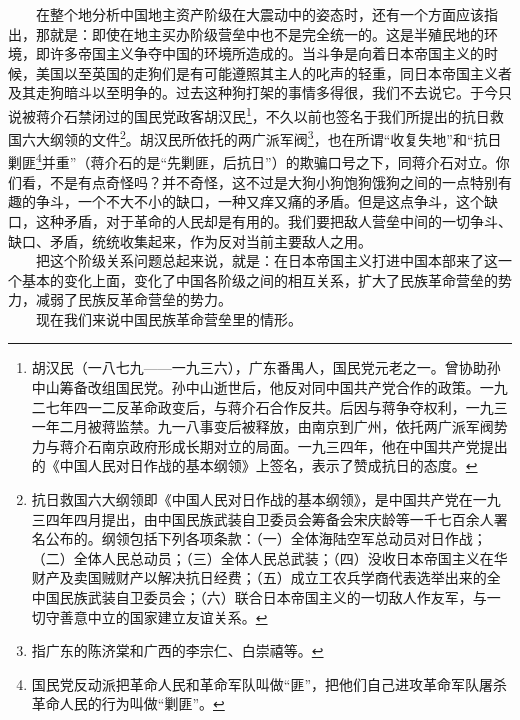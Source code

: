 \documentclass[cn,11pt,chinese]{elegantbook}
\begin{document}
　　在整个地分析中国地主资产阶级在大震动中的姿态时，还有一个方面应该指出，那就是：即使在地主买办阶级营垒中也不是完全统一的。这是半殖民地的环境，即许多帝国主义争夺中国的环境所造成的。当斗争是向着日本帝国主义的时候，美国以至英国的走狗们是有可能遵照其主人的叱声的轻重，同日本帝国主义者及其走狗暗斗以至明争的。过去这种狗打架的事情多得很，我们不去说它。于今只说被蒋介石禁闭过的国民党政客胡汉民\footnote[16]{ 胡汉民（一八七九——一九三六），广东番禺人，国民党元老之一。曾协助孙中山筹备改组国民党。孙中山逝世后，他反对同中国共产党合作的政策。一九二七年四一二反革命政变后，与蒋介石合作反共。后因与蒋争夺权利，一九三一年二月被蒋监禁。九一八事变后被释放，由南京到广州，依托两广派军阀势力与蒋介石南京政府形成长期对立的局面。一九三四年，他在中国共产党提出的《中国人民对日作战的基本纲领》上签名，表示了赞成抗日的态度。}，不久以前也签名于我们所提出的抗日救国六大纲领的文件\footnote[17]{ 抗日救国六大纲领即《中国人民对日作战的基本纲领》，是中国共产党在一九三四年四月提出，由中国民族武装自卫委员会筹备会宋庆龄等一千七百余人署名公布的。纲领包括下列各项条款：（一）全体海陆空军总动员对日作战；（二）全体人民总动员；（三）全体人民总武装；（四）没收日本帝国主义在华财产及卖国贼财产以解决抗日经费；（五）成立工农兵学商代表选举出来的全中国民族武装自卫委员会；（六）联合日本帝国主义的一切敌人作友军，与一切守善意中立的国家建立友谊关系。}。胡汉民所依托的两广派军阀\footnote[18]{ 指广东的陈济棠和广西的李宗仁、白崇禧等。}，也在所谓“收复失地”和“抗日剿匪\footnote[19]{ 国民党反动派把革命人民和革命军队叫做“匪”，把他们自己进攻革命军队屠杀革命人民的行为叫做“剿匪”。}并重”（蒋介石的是“先剿匪，后抗日”）的欺骗口号之下，同蒋介石对立。你们看，不是有点奇怪吗？并不奇怪，这不过是大狗小狗饱狗饿狗之间的一点特别有趣的争斗，一个不大不小的缺口，一种又痒又痛的矛盾。但是这点争斗，这个缺口，这种矛盾，对于革命的人民却是有用的。我们要把敌人营垒中间的一切争斗、缺口、矛盾，统统收集起来，作为反对当前主要敌人之用。\\
　　把这个阶级关系问题总起来说，就是：在日本帝国主义打进中国本部来了这一个基本的变化上面，变化了中国各阶级之间的相互关系，扩大了民族革命营垒的势力，减弱了民族反革命营垒的势力。\\
　　现在我们来说中国民族革命营垒里的情形。\\
\end{document}
